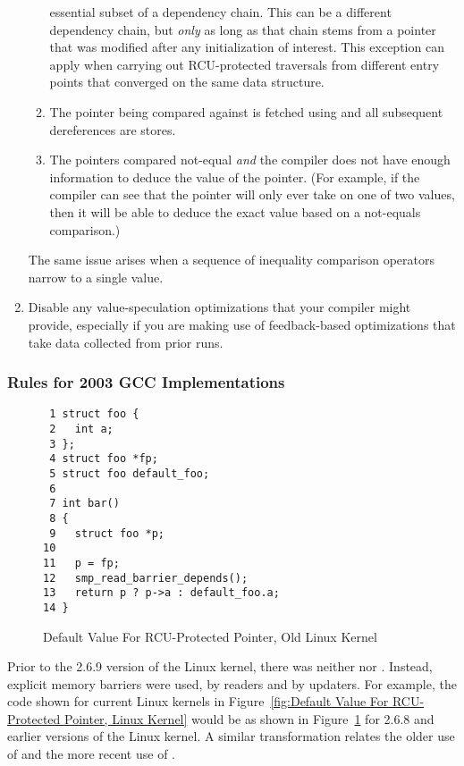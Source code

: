 \documentclass[letterpaper,twocolumn,10pt]{article}
\begin{document}
\begin{enumerate}
\begin{enumerate}
		essential subset of a dependency chain.
		This can be a different dependency chain, but \emph{only}
		as long as that chain stems from a pointer that was modified
		after any initialization of interest.
		This exception can apply when carrying out RCU-protected
		traversals from different entry points that converged
		on the same data structure.
	\item	The pointer being compared against is fetched using
		 and all subsequent
		dereferences are stores.
	\item	The pointers compared not-equal \emph{and} the compiler
		does not have enough information to deduce the value
		of the pointer.
		(For example, if the compiler can see that the pointer
		will only ever take on one of two values, then it
		will be able to deduce the exact value based on a not-equals
		comparison.)
	\end{enumerate}
	The same issue arises when a sequence of inequality comparison
	operators narrow to a single value.
\item	Disable any value-speculation optimizations that your compiler
	might provide, especially if you are making use of feedback-based
	optimizations that take data collected from prior runs.
\end{enumerate}

\subsubsection{Rules for 2003 GCC Implementations}
\label{sec:Rules for 2003 GCC Implementations}

\begin{figure}[tbp]
{ \scriptsize
\begin{verbatim}
 1 struct foo {
 2   int a;
 3 };
 4 struct foo *fp;
 5 struct foo default_foo;
 6 
 7 int bar()
 8 {
 9   struct foo *p;
10 
11   p = fp;
12   smp_read_barrier_depends();
13   return p ? p->a : default_foo.a;
14 }
\end{verbatim}
}
\caption{Default Value For RCU-Protected Pointer, Old Linux Kernel}
\label{fig:Default Value For RCU-Protected Pointer, Old Linux Kernel}
\end{figure}

Prior to the 2.6.9 version of the Linux kernel, there was neither
 nor .
Instead, explicit memory barriers were used,
 by readers and
 by updaters.
For example, the code shown for current Linux kernels in
Figure~\ref{fig:Default Value For RCU-Protected Pointer, Linux Kernel}
would be as shown in
Figure~\ref{fig:Default Value For RCU-Protected Pointer, Old Linux Kernel}
for 2.6.8 and earlier versions of the Linux kernel.
A similar transformation relates the older use of  and
the more recent use of .
\end{document}

